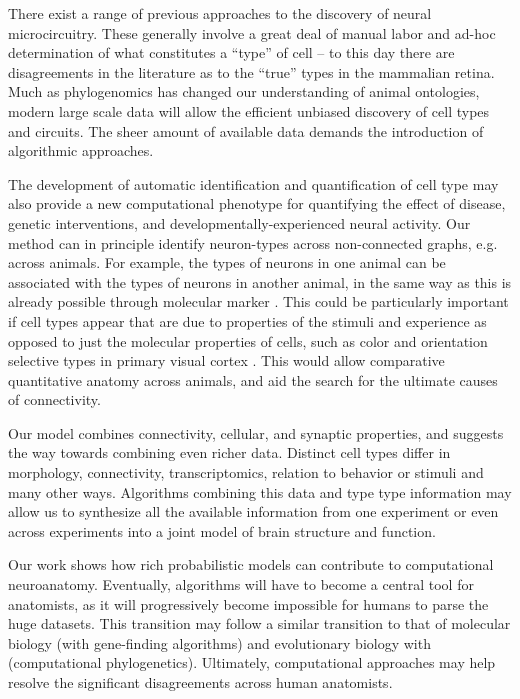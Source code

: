 \documentclass{article}
\begin{document}
There exist a range of previous approaches to the discovery of neural
microcircuitry\autocite{Mountcastle1957, Douglas1991, Bartho2004,
  Freund1998}.  These generally involve a great deal of manual labor
and ad-hoc determination of what constitutes a “type” of cell -- to
this day there are disagreements in the literature as to the “true”
types in the mammalian retina. Much as phylogenomics has changed our
understanding of animal ontologies, modern large scale data will allow
the efficient unbiased discovery of cell types and circuits. The sheer
amount of available data demands the introduction of algorithmic
approaches.

The development of automatic identification and quantification of cell
type may also provide a new computational phenotype for quantifying
the effect of disease, genetic interventions, and
developmentally-experienced neural activity. Our method can in
principle identify neuron-types across non-connected graphs,
e.g. across animals. For example, the types of neurons in one animal
can be associated with the types of neurons in another animal, in the
same way as this is already possible through molecular marker
\autocite{Brown2009}. This could be particularly important if cell
types appear that are due to properties of the stimuli and experience
as opposed to just the molecular properties of cells, such as color
and orientation selective types in primary visual cortex
\autocite{Sincich2005,Lennie2005}. This would allow comparative
quantitative anatomy across animals, and aid the search for the
ultimate causes of connectivity.

Our model combines connectivity, cellular, and synaptic properties,
and suggests the way towards combining even richer data. Distinct cell
types differ in morphology, connectivity, transcriptomics, relation to
behavior or stimuli and many other ways. Algorithms combining this
data and type type information may allow us to synthesize all the
available information from one experiment or even across experiments
into a joint model of brain structure and function.

Our work shows how rich probabilistic models can contribute to computational neuroanatomy. 
Eventually, algorithms will have to become a central tool for
anatomists, as it will progressively become impossible for humans to
parse the huge datasets. This transition may follow a similar
transition to that of molecular biology (with gene-finding
algorithms) and evolutionary biology with (computational
phylogenetics). Ultimately, computational approaches may help resolve the significant
disagreements across human anatomists. 
\end{document}

